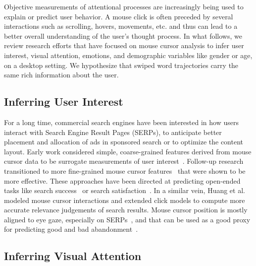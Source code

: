 \documentclass[sn-mathphys, pdflatex]{sn-jnl}
\begin{document}
Objective measurements of attentional processes are increasingly being used to explain or predict user behavior.
A mouse click is often preceded by several interactions such as scrolling, hovers, movements, etc.
and thus can lead to a better overall understanding of the user's thought process.
In what follows, we review research efforts that have focused on mouse cursor analysis
to infer user interest, visual attention, emotions, and demographic variables like gender or age, on a desktop setting.
We hypothesize that swiped word trajectories carry the same rich information about the user.

\subsection{Inferring User Interest}
\label{sec:interest}

For a long time, commercial search engines have been interested in how users interact with Search Engine Result Pages (SERPs),
to anticipate better placement and allocation of ads in sponsored search or to optimize the content layout.
Early work considered simple, coarse-grained features derived from mouse cursor data
to be surrogate measurements of user interest~\cite{Claypool01_iii, Shapira06_ii}.
Follow-up research transitioned to more fine-grained mouse cursor features~\cite{Guo08_query, Guo10_buy}
that were shown to be more effective.
These approaches have been directed at predicting open-ended tasks
like search success~\cite{Guo12_success} or search satisfaction~\cite{Liu15_opinions}.
In a similar vein, Huang et al.~\cite{Huang12_search, Huang11_clicks}
modeled mouse cursor interactions and extended click models to compute more accurate relevance judgements of search results.
Mouse cursor position is mostly aligned to eye gaze,
especially on SERPs~\cite{Guo12_rel, Speicher13_rel},
and that can be used as a good proxy for predicting good and bad abandonment~\cite{Diriye12_leaving}.

\subsection{Inferring Visual Attention}
\label{sec:attention}
\end{document}
